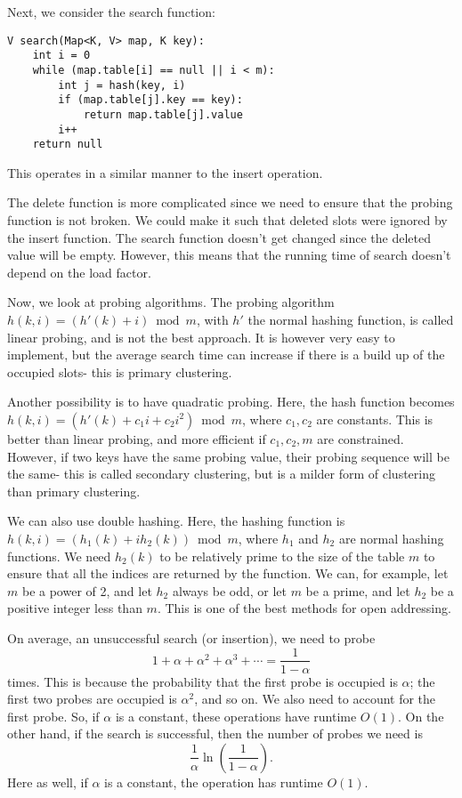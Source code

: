 \documentclass[a4paper, openany]{memoir}
\begin{document}
\noindent Next, we consider the search function:
\begin{lstlisting}[language=pseudocode]
V search(Map<K, V> map, K key):
    int i = 0
    while (map.table[i] == null || i < m):
        int j = hash(key, i)
        if (map.table[j].key == key):
            return map.table[j].value
        i++
    return null
\end{lstlisting}
This operates in a similar manner to the insert operation.

\noindent The delete function is more complicated since we need to ensure that the probing function is not broken. We could make it such that deleted slots were ignored by the insert function. The search function doesn't get changed since the deleted value will be empty. However, this means that the running time of search doesn't depend on the load factor.

\noindent Now, we look at probing algorithms. The probing algorithm $h(k, i) = (h'(k) + i) \bmod{m}$, with $h'$ the normal hashing function, is called linear probing, and is not the best approach. It is however very easy to implement, but the average search time can increase if there is a build up of the occupied slots- this is primary clustering.

\noindent Another possibility is to have quadratic probing. Here, the hash function becomes $h(k, i) = (h'(k) + c_1i + c_2i^2) \bmod{m}$, where $c_1, c_2$ are constants. This is better than linear probing, and more efficient if $c_1, c_2, m$ are constrained. However, if two keys have the same probing value, their probing sequence will be the same- this is called secondary clustering, but is a milder form of clustering than primary clustering.

\noindent We can also use double hashing. Here, the hashing function is $h(k, i) = (h_1(k) + ih_2(k)) \bmod{m}$, where $h_1$ and $h_2$ are normal hashing functions. We need $h_2(k)$ to be relatively prime to the size of the table $m$ to ensure that all the indices are returned by the function. We can, for example, let $m$ be a power of 2, and let $h_2$ always be odd, or let $m$ be a prime, and let $h_2$ be a positive integer less than $m$. This is one of the best methods for open addressing.

\noindent On average, an unsuccessful search (or insertion), we need to probe 
\[1 + \alpha + \alpha^2 + \alpha^3 + \cdots = \frac{1}{1-\alpha}\]
times. This is because the probability that the first probe is occupied is $\alpha$; the first two probes are occupied is $\alpha^2$, and so on. We also need to account for the first probe. So, if $\alpha$ is a constant, these operations have runtime $O(1)$. On the other hand, if the search is successful, then the number of probes we need is
\[\frac{1}{\alpha} \ln \left(\frac{1}{1-\alpha}\right).\]
Here as well, if $\alpha$ is a constant, the operation has runtime $O(1)$.
\end{document}
